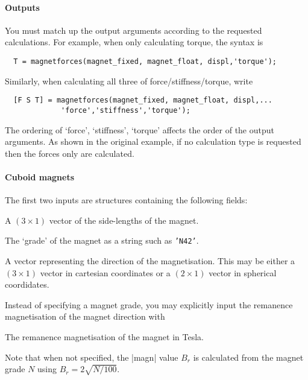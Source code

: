 \documentclass{article}
\begin{document}
\paragraph{Outputs}
You must match up the output arguments according to the requested calculations.
For example, when only calculating torque, the syntax is
\begin{verbatim}
  T = magnetforces(magnet_fixed, magnet_float, displ,'torque');
\end{verbatim}
Similarly, when calculating all three of force/stiffness/torque, write
\begin{verbatim}
  [F S T] = magnetforces(magnet_fixed, magnet_float, displ,...
	         'force','stiffness','torque');
\end{verbatim}
The ordering of `force', `stiffness', `torque' affects the order of the output
arguments.
As shown in the original example, if no calculation type is requested then
the forces only are calculated.

\paragraph{Cuboid magnets}
The first two inputs are structures containing the following fields:
\begin{description}[noitemsep,font=\ttfamily]
\item[magnet.dim] A $(3\times1)$ vector of the side-lengths of the magnet.
\item[magnet.grade] The `grade' of the magnet as a string such as \texttt{'N42'}.
\item[magnet.magdir] A vector representing the direction of the magnetisation.
              This may be either a $(3\times1)$ vector in cartesian
              coordinates or a $(2\times1)$ vector in spherical coordidates.
\end{description}
Instead of specifying a magnet grade, you may explicitly input the remanence magnetisation
of the magnet direction with
\begin{description}[noitemsep,font=\ttfamily]
\item[magnet.magn] The remanence magnetisation of the magnet in Tesla.
\end{description}
Note that when not specified, the |magn| value $B_r$ is calculated from the magnet grade $N$ using $B_r=2\sqrt{N/100}$.
\end{document}
